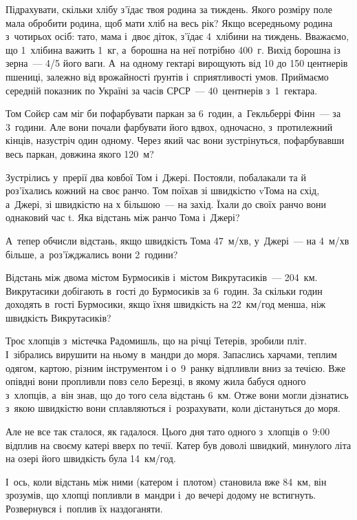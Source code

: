 \problem
Підрахувати, скільки хлібу з’їдає твоя родина за тиждень.
Якого розміру поле мала обробити родина, щоб мати хліб на весь рік?
Якщо всередньому родина з~чотирьох осіб: тато, мама і~двоє діток,
з’їдає 4~хлібини на тиждень. Вважаємо, що 1~хлібина важить 1~кг,
а~борошна на неї потрібно 400~г. Вихід борошна із зерна~--- 4/5 його ваги.
А~на одному гектарі вирощують від 10 до 150 центнерів пшениці,
залежно від врожайності ґрунтів і~сприятливості умов.
Приймаємо середній показник по Україні за часів СРСР~---
40~центнерів з~1~гектара.


\problem
Том Сойєр сам міг би пофарбувати паркан за 6~годин,
а~Гекльберрі Фінн~--- за 3~години. Але вони почали фарбувати його вдвох,
одночасно, з~протилежний кінців, назустріч один одному.
Через який час вони зустрінуться, пофарбувавши весь паркан,
довжина якого 120~м?


\problem
Зустрілись у~прерії два ковбої Том і~Джері. Постояли, побалакали та й
роз’їхались кожний на своє ранчо. Том поїхав зі швидкістю vТома на схід,
а~Джері, зі швидкістю на х більшою~--- на захід. Їхали до своїх ранчо
вони однаковий час t. Яка відстань між ранчо Тома і~Джері?

А~тепер обчисли відстань, якщо швидкість Тома 47~м/хв,
у~Джері~--- на 4~м/хв більше, а~роз’їжджались вони 2~години?


\problem
Відстань між двома містом Бурмосиків і~містом Викрутасиків~--- 204~км.
Викрутасики добігають в~гості до Бурмосиків за 6~годин.
За скільки годин доходять в~гості Бурмосики,
якщо їхня швидкість на 22~км/год менша, ніж швидкість Викрутасиків?


\problem
{}
Троє хлопців з~містечка Радомишль, що на річці Тетерів, зробили пліт.
І~зібрались вирушити на ньому в~мандри до моря. Запаслись харчами,
теплим одягом, картою, різним інструментом і о~9~ранку відпливли вниз
за течією. Вже опівдні вони пропливли повз село Березці, в якому жила
бабуся одного з~хлопців, а~він знав, що до того села відстань 6~км.
Отже вони могли дізнатись з~якою швидкістю вони сплавляються
і~розрахувати, коли дістануться до моря.

Але не все так сталося, як гадалося. Цього дня тато одного з~хлопців
о~9:00 відплив на своєму катері вверх по течії. Катер був доволі швидкий,
минулого літа на озері його швидкість була 14~км/год.

І~ось, коли відстань між ними (катером і~плотом) становила вже 84~км,
він зрозумів, що хлопці попливли в~мандри і~до вечері додому не встигнуть.
Розвернувся і~поплив їх наздоганяти.

